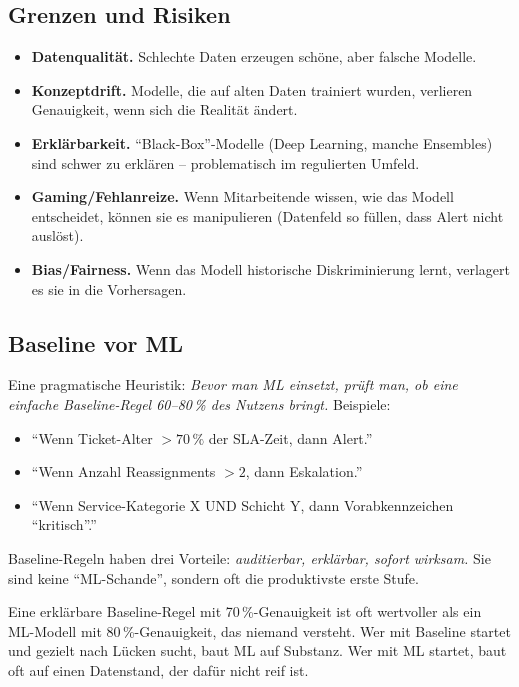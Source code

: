 \documentclass[11pt,a4paper,oneside]{article}
\newcommand{\fachbegriff}[1]{\textbf{#1}}
\begin{document}
\subsection{Grenzen und Risiken}

\begin{itemize}
  \item \fachbegriff{Datenqualität.} Schlechte Daten erzeugen schöne, aber falsche Modelle.
  \item \fachbegriff{Konzeptdrift.} Modelle, die auf alten Daten trainiert wurden, verlieren Genauigkeit, wenn sich die Realität ändert.
  \item \fachbegriff{Erklärbarkeit.} ``Black-Box''-Modelle (Deep Learning, manche Ensembles) sind schwer zu erklären -- problematisch im regulierten Umfeld.
  \item \fachbegriff{Gaming/Fehlanreize.} Wenn Mitarbeitende wissen, wie das Modell entscheidet, können sie es manipulieren (Datenfeld so füllen, dass Alert nicht auslöst).
  \item \fachbegriff{Bias/Fairness.} Wenn das Modell historische Diskriminierung lernt, verlagert es sie in die Vorhersagen.
\end{itemize}

\subsection{Baseline vor ML}

Eine pragmatische Heuristik: \emph{Bevor man ML einsetzt, prüft man, ob eine einfache Baseline-Regel 60--80\,\% des Nutzens bringt.} Beispiele:

\begin{itemize}
  \item ``Wenn Ticket-Alter $> 70\,\%$ der SLA-Zeit, dann Alert.''
  \item ``Wenn Anzahl Reassignments $> 2$, dann Eskalation.''
  \item ``Wenn Service-Kategorie X UND Schicht Y, dann Vorabkennzeichen ``kritisch''.''
\end{itemize}

Baseline-Regeln haben drei Vorteile: \emph{auditierbar, erklärbar, sofort wirksam.} Sie sind keine ``ML-Schande'', sondern oft die produktivste erste Stufe.

\begin{merkbox}
Eine erklärbare Baseline-Regel mit 70\,\%-Genauigkeit ist oft wertvoller als ein ML-Modell mit 80\,\%-Genauigkeit, das niemand versteht. Wer mit Baseline startet und gezielt nach Lücken sucht, baut ML auf Substanz. Wer mit ML startet, baut oft auf einen Datenstand, der dafür nicht reif ist.
\end{merkbox}
\end{document}
